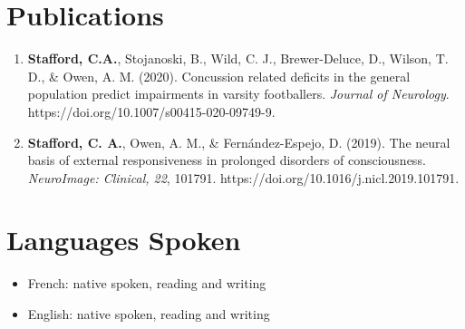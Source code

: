 \documentclass[letterpaper]{twentysecondcv} %
\begin{document}

\section{Publications}

\begin{enumerate} %
	\item \textbf{Stafford, C.A.}, Stojanoski, B., Wild, C. J., Brewer-Deluce, D., Wilson, T. D., \& Owen, A. M. (2020). Concussion related deficits in the general population predict impairments in varsity footballers. \emph{Journal of Neurology}.\newline
	https://doi.org/10.1007/s00415-020-09749-9.
	\item \textbf{Stafford, C. A.}, Owen, A. M., \& Fern\'andez-Espejo, D. (2019). The neural basis of external responsiveness in prolonged disorders of consciousness. \emph{NeuroImage: Clinical, 22}, 101791. https://doi.org/10.1016/j.nicl.2019.101791.
\end{enumerate}


\section{Languages Spoken}

\begin{itemize}
	\item French: native spoken, reading and writing
	\item English: native spoken, reading and writing
\end{itemize}


\newpage %
\makeprofile %

\end{document}
